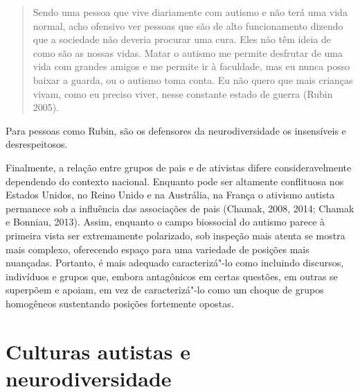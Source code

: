 \begin{quote}
Sendo uma pessoa que vive diariamente com autismo e não terá uma vida
normal, acho ofensivo ver pessoas que são de alto funcionamento dizendo
que a sociedade não deveria procurar uma cura. Eles não têm ideia de
como são as nossas vidas. Matar o autismo me permite desfrutar de uma
vida com grandes amigos e me permite ir à faculdade, mas eu nunca posso
baixar a guarda, ou o autismo toma conta. Eu não quero que mais crianças
vivam, como eu preciso viver, nesse constante estado de guerra (Rubin
2005).
\end{quote}

Para pessoas como Rubin, são os defensores da neurodiversidade os
insensíveis e desrespeitosos.

Finalmente, a relação entre grupos de pais e de ativistas difere
consideravelmente dependendo do contexto nacional. Enquanto pode ser
altamente conflituosa nos Estados Unidos, no Reino Unido e na Austrália,
na França o ativismo autista permanece sob a influência das associações
de pais (Chamak, 2008, 2014; Chamak e Bonniau, 2013). Assim, enquanto o
campo biossocial do autismo parece à primeira vista ser extremamente
polarizado, sob inspeção mais atenta se mostra mais complexo, oferecendo
espaço para uma variedade de posições mais nuançadas. Portanto, é mais
adequado caracterizá"-lo como incluindo discursos, indivíduos e grupos
que, embora antagônicos em certas questões, em outras se superpõem e
apoiam, em vez de caracterizá"-lo como um choque de grupos homogêneos
sustentando posições fortemente opostas.

\chapter{Culturas autistas e neurodiversidade}

